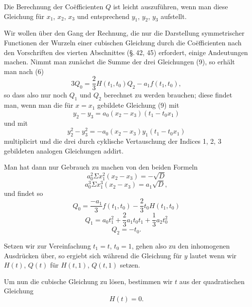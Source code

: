 
Die Berechnung der Co\"efficienten $Q$ ist leicht auszuführen, wenn man diese Gleichung für $x_1$, $x_2$, $x_3$ und entsprechend $y_1$, $y_2$, $y_3$ aufstellt.

Wir wollen über den Gang der Rechnung, die nur die Darstellung symmetrischer Functionen der Wurzeln einer cubischen Gleichung durch die Co\"efficienten nach den Vorschriften des vierten Abschnittes (\S.\,42, 45) erfordert, einige Andeutungen machen. Nimmt man zunächst die Summe der drei Gleichungen (9), so erhält man nach (6)
\[
3 Q_0 = \frac{2}{3} H(t_1, t_0) Q_2 - a_1 f(t_1, t_0),
\]
so dass also nur noch $Q_1$ und $Q_2$ berechnet zu werden brauchen; diese findet man, wenn man die für $x = x_1$ gebildete Gleichung (9) mit
\[
y_2 - y_3 = a_0 (x_2 - x_3) (t_1 - t_0 x_1)
\]
und mit
\[
y_2^2 - y_3^2 = -a_0 (x_2 - x_3) y_1 (t_1 - t_0 x_1)
\]
multiplicirt und die drei durch cyklische Vertauschung der Indices 1, 2, 3 gebildeten analogen Gleichungen addirt.

Man hat dann nur Gebrauch zu machen von den beiden Formeln
\[
a_0^2 \Sigma x_1^2 (x_2 - x_3) = -\sqrt{D}
\]
\[
a_0^3 \Sigma x_1^3 (x_2 - x_3) = a_1 \sqrt{D},
\]
und findet so
\[
Q_0 = \frac{-a_1}{3} f(t_1, t_0) - \frac{2}{3} t_0 H(t_1, t_0)
\]
\[
Q_1 = a_0 t_1^2 + \frac{2}{3} a_1 t_0 t_1 + \frac{1}{3} a_2 t_0^2
\]
\[
Q_2 = -t_0.
\]

Setzen wir zur Vereinfachung $t_1 = t$, $t_0 = 1$, gehen also zu den inhomogenen Ausdrücken über, so ergiebt sich
während die Gleichung für $y$ lautet
wenn wir $H(t)$, $Q(t)$ für $H(t, 1)$, $Q(t, 1)$ setzen.

Um nun die cubische Gleichung zu lösen, bestimmen wir $t$ aus der quadratischen Gleichung
\[
H(t) = 0.
\]
